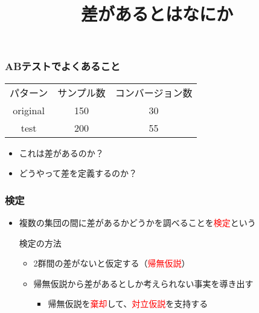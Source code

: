 \documentclass[aspectratio=169]{beamer}
\title{差があるとはなにか}
\begin{document}
    \begin{frame}
        \titlepage
    \end{frame}
    \begin{frame}
        \frametitle{ABテストでよくあること}
        \begin{center}
        \begin{tabular}{ccc}
            \hline
            パターン & サンプル数 & コンバージョン数 \\
            original & 150 & 30 \\
            test & 200 & 55 \\
            \hline
        \end{tabular}
        \end{center}
        \begin{itemize}
            \item これは差があるのか？
            \item どうやって差を定義するのか？
        \end{itemize}
    \end{frame}
    \begin{frame}
        \frametitle{検定}
        \begin{itemize}
            \item 複数の集団の間に差があるかどうかを調べることを\textcolor{red}{検定}という
            \begin{block}{検定の方法}
                \begin{itemize}
                    \item 2群間の差がないと仮定する（\textcolor{red}{帰無仮説}）
                    \item 帰無仮説から差があるとしか考えられない事実を導き出す
                    \begin{itemize}
                        \item 帰無仮説を\textcolor{red}{棄却}して、\textcolor{red}{対立仮説}を支持する
                    \end{itemize}
                \end{itemize}
            \end{block}
        \end{itemize}
    \end{frame}
\end{document}
